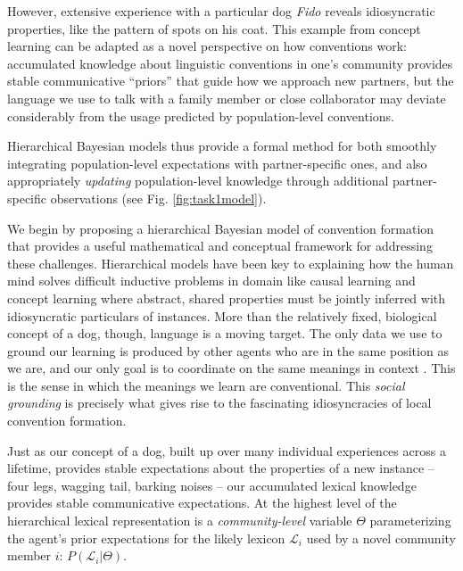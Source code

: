 However, extensive experience with a particular dog \emph{Fido} reveals idiosyncratic properties, like the pattern of spots on his coat.
This example from concept learning can be adapted as a novel perspective on how conventions work: accumulated knowledge about linguistic conventions in one's community provides stable communicative ``priors'' that guide how we approach new partners, but the language we use to talk with a family member or close collaborator may deviate considerably from the usage predicted by population-level conventions.

Hierarchical Bayesian models thus provide a formal method for both smoothly integrating population-level expectations with partner-specific ones, and also appropriately \emph{updating} population-level knowledge through additional partner-specific observations (see Fig. \ref{fig:task1model}).

We begin by proposing a hierarchical Bayesian model of convention formation \cite{GelmanEtAl14_BDA,TenenbaumKempGriffithsGoodman11_Grow_a_Mind_Science} that provides a useful mathematical and conceptual framework for addressing these challenges. Hierarchical models have been key to explaining how the human mind solves difficult inductive problems in domain like causal learning \cite{KempGoodmanTenenbaum10_LearningToLearn,GoodmanUllmanTenenbaum11_TheoryOfCausality} and concept learning \cite{KempPerforsTenenbaum07_HBM} where abstract, shared properties must be jointly inferred with idiosyncratic particulars of instances. More than the relatively fixed, biological concept of a dog, though, language is a moving target. The only data we use to ground our learning is produced by other agents who are in the same position as we are, and our only goal is to coordinate on the same meanings in context \cite{HassonGhazanfar___Keysers12BrainToBrain}. This is the sense in which the meanings we learn are conventional. This \emph{social grounding} is precisely what gives rise to the fascinating idiosyncracies of local convention formation.

Just as our concept of a dog, built up over many individual experiences across a lifetime, provides stable expectations about the properties of a new instance -- four legs, wagging tail, barking noises -- our accumulated lexical knowledge provides stable communicative expectations. 
At the highest level of the hierarchical lexical representation is a \emph{community-level} variable $\Theta$ parameterizing the agent's prior expectations for the likely lexicon $\mathcal{L}_i$ used by a novel community member $i$: $P(\mathcal{L}_i | \Theta)$. 

